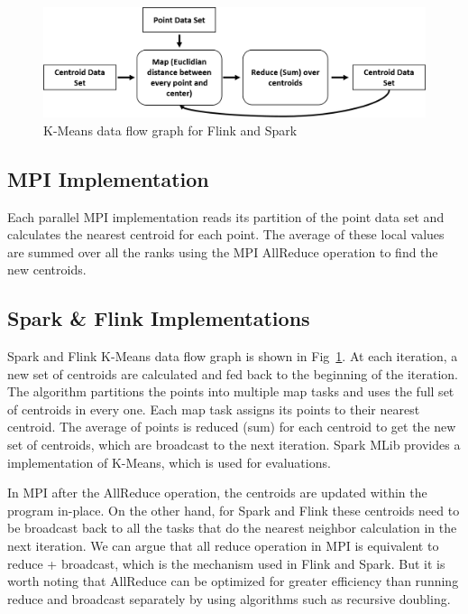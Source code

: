 \documentclass[conference]{IEEEtran}
\begin{document}
\begin{figure}
    \centering
    \includegraphics[width=0.95\columnwidth]{images/k-means.png}
    \caption{K-Means data flow graph for Flink and Spark}
    \label{fig:fig_k_means_flow}
\end{figure}

\subsection{MPI Implementation}

Each parallel MPI implementation reads its partition of the point data set and calculates the nearest centroid for each point. The average of these local values are summed over all the ranks using the MPI AllReduce operation to find the new centroids.

\subsection{Spark \& Flink Implementations}

Spark and Flink K-Means data flow graph is shown in Fig~\ref{fig:fig_k_means_flow}. At each iteration, a new set of centroids are calculated and fed back to the beginning of the iteration. The algorithm partitions the points into multiple map tasks and uses the full set of centroids in every one. Each map task assigns its points to their nearest centroid. The average of points is reduced (sum) for each centroid to get the new set of centroids, which are broadcast to the next iteration. Spark MLib provides a implementation of K-Means, which is used for evaluations. 

In MPI after the AllReduce operation, the centroids are updated within the program in-place. On the other hand, for Spark and Flink these centroids need to be broadcast back to all the tasks that do the nearest neighbor calculation in the next iteration. We can argue that all reduce operation in MPI is equivalent to reduce + broadcast, which is the mechanism used in Flink and Spark. But it is worth noting that AllReduce can be optimized for greater efficiency than running reduce and broadcast separately by using algorithms such as recursive doubling.
\end{document}
